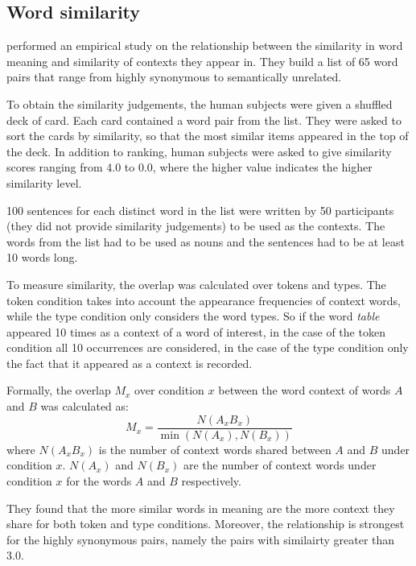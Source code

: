 \subsection{Word similarity}
\label{sec:lexical-similarity}

 performed an empirical study on the relationship between the similarity in word meaning and similarity of contexts they appear in. They build a list of 65 word pairs that range from highly synonymous to semantically unrelated.

To obtain the similarity judgements, the human subjects were given a shuffled deck of card. Each card contained a word pair from the list. They were asked to sort the cards by similarity, so that the most similar items appeared in the top of the deck. In addition to ranking, human subjects were asked to give similarity scores ranging from 4.0 to 0.0, where the higher value indicates the higher similarity level.

100 sentences for each distinct word in the list were written by 50 participants (they did not provide similarity judgements) to be used as the contexts. The words from the list had to be used as nouns and the sentences had to be at least 10 words long.

To measure similarity, the overlap was calculated over tokens and types. The token condition takes into account the appearance frequencies of context words, while the type condition only considers the word types. So if the word \textit{table} appeared 10 times as a context of a word of interest, in the case of the token condition all 10 occurrences are considered, in the case of the type condition only the fact that it appeared as a context is recorded.

Formally, the overlap $M_x$ over condition $x$ between the word context of words $A$ and $B$ was calculated as:
%
\begin{equation*}
  M_x = \frac{N(A_xB_x)}{\min(N(A_x), N(B_x))}
\end{equation*}
%
where $N(A_xB_x)$ is the number of context words shared between $A$ and $B$ under condition $x$. $N(A_x)$ and $N(B_x)$ are the number of context words under condition $x$ for the words $A$ and $B$ respectively.

They found that the more similar words in meaning are the more context they share for both token and type conditions. Moreover, the relationship is strongest for the highly synonymous pairs, namely the pairs with similairty greater than 3.0.

